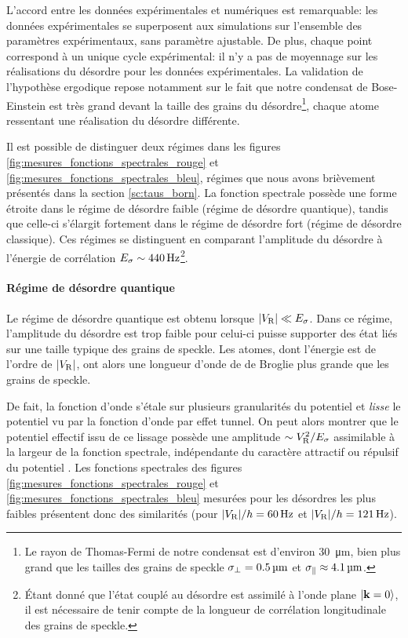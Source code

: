 L'accord entre les données expérimentales et numériques est remarquable: les données expérimentales se superposent aux simulations sur l'ensemble des paramètres expérimentaux, sans paramètre ajustable. De plus, chaque point correspond à un unique cycle expérimental: il n'y a pas de moyennage sur les réalisations du désordre pour les données expérimentales. La validation de l'hypothèse ergodique repose notamment sur le fait que notre condensat de Bose-Einstein est très grand devant la taille des grains du désordre\footnote{Le rayon de Thomas-Fermi de notre condensat est d'environ \SI{30}{\micro\metre}, bien plus grand que les tailles des grains de speckle $\sigma_{\perp}=\SI{0.5}{\micro\metre}$ et $\sigma_{\parallel}\approx\SI{4.1}{\micro\metre}$.}, chaque atome ressentant une réalisation du désordre différente.

Il est possible de distinguer deux régimes dans les figures \ref{fig:mesures_fonctions_spectrales_rouge} et \ref{fig:mesures_fonctions_spectrales_bleu}, régimes que nous avons brièvement présentés dans la section \ref{sc:taus_born}. La fonction spectrale possède une forme étroite dans le régime de désordre faible (régime de désordre quantique), tandis que celle-ci s'élargit fortement dans le régime de désordre fort (régime de désordre classique). Ces régimes se distinguent en comparant l'amplitude du désordre à l'énergie de corrélation $E_{\sigma}\sim\SI{440}{\hertz}$\footnote{Étant donné que l'état couplé au désordre est assimilé à l'onde plane $\protect\left| \mathbf{k}=0 \right\rangle$, il est nécessaire de tenir compte de la longueur de corrélation longitudinale des grains de speckle.}.





\paragraph*{Régime de désordre quantique}
Le régime de désordre quantique est obtenu lorsque $|V_{\mathrm{R}}|\ll E_{\sigma}$. Dans ce régime, l'amplitude du désordre est trop faible pour celui-ci puisse supporter des état liés sur une taille typique des grains de speckle. Les atomes, dont l'énergie est de l'ordre de $|V_{\mathrm{R}}|$, ont alors une longueur d'onde de de Broglie plus grande que les grains de speckle. 

De fait, la fonction d'onde s'étale sur plusieurs granularités du potentiel et \emph{lisse} le potentiel vu par la fonction d'onde par effet tunnel. On peut alors montrer que le potentiel effectif issu de ce lissage possède une amplitude $\sim V_{\mathrm{R}}^2/E_{\sigma}$ assimilable à la largeur de la fonction spectrale, indépendante du caractère attractif ou répulsif du potentiel \citep{bloch2012quantum}\citep{pasek2017anderson}. Les fonctions spectrales des figures \ref{fig:mesures_fonctions_spectrales_rouge} et \ref{fig:mesures_fonctions_spectrales_bleu} mesurées pour les désordres les plus faibles présentent donc des similarités (pour $|V_{\mathrm{R}}|/h=\SI{60}{\hertz}$ et $|V_{\mathrm{R}}|/h=\SI{121}{\hertz}$). 

